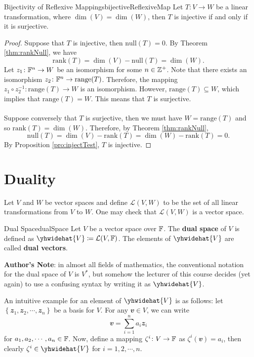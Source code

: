 \documentclass[math, code]{amznotes}
\theoremstyle{remark}
\begin{document}
\begin{corbox}{Bijectivity of Reflexive Mappings}{bijectiveReflexiveMap}
    Let $T \colon V \to W$ be a linear transformation, where $\dim(V) = \dim(W)$, then $T$ is injective if and only if it is surjective.
    \tcblower
    \begin{proof}
        Suppose that $T$ is injective, then $\mathrm{null}(T) = 0$. By Theorem \ref{thm:rankNull}, we have 
        \begin{equation*}
            \mathrm{rank}(T) = \dim(V) - \mathrm{null}(T) = \dim(W).
        \end{equation*} 
        Let $z_1 \colon \mathbb{F}^n \to W$ be an isomorphism for some $n \in \mathbb{Z}^+$. Note that there exists an isomorphism $z_2 \colon \mathbb{F}^n \to \mathrm{range}(T)$. Therefore, the mapping $z_1 \circ z_2^{-1} \colon \mathrm{range}(T) \to W$ is an isomorphism. However, $\mathrm{range}(T) \subseteq W$, which implies that $\mathrm{range}(T) = W$. This means that $T$ is surjective.
        \\\\
        Suppose conversely that $T$ is surjective, then we must have $W = \mathrm{range}(T)$ and so $\mathrm{rank}(T) = \dim(W)$. Therefore, by Theorem \ref{thm:rankNull}, 
        \begin{equation*}
            \mathrm{null}(T) = \dim(V) - \mathrm{rank}(T) = \dim(W) - \mathrm{rank}(T) = 0.
        \end{equation*}
        By Proposition \ref{pro:injectTest}, $T$ is injective.
    \end{proof}
\end{corbox}
\section{Duality}
Let $V$ and $W$ be vector spaces and define $\mathcal{L}(V, W)$ to be the set of all linear transformations from $V$ to $W$. One may check that $\mathcal{L}(V, W)$ is a vector space.
\begin{dfnbox}{Dual Space}{dualSpace}
    Let $V$ be a vector space over $\mathbb{F}$. The {\color{red} \textbf{dual space}} of $V$ is defined as $\yhwidehat{V} \coloneqq \mathcal{L}(V, \F)$. The elements of $\yhwidehat{V}$ are called {\color{red} \textbf{dual vectors}}.
\end{dfnbox}
\begin{notebox}
    \textbf{Author's Note}: in almost all fields of mathematics, the conventional notation for the dual space of $V$ is $V^*$, but somehow the lecturer of this course decides (yet again) to use a confusing syntax by writing it as $\yhwidehat{V}$.
\end{notebox}
An intuitive example for an element of $\yhwidehat{V}$ is as follows: let $\left\{\mathbfit{z}_1, \mathbfit{z}_2, \cdots, \mathbfit{z}_n\right\}$ be a basis for $V$. For any $\mathbfit{v} \in V$, we can write
\begin{equation*}
    \mathbfit{v} = \sum_{i = 1}^{n}a_i\mathbfit{z}_i
\end{equation*}
for $a_1, a_2, \cdots, a_n \in \mathbb{F}$. Now, define a mapping $\zeta^i \colon V \to \mathbb{F}$ as $\zeta^i(\mathbfit{v}) = a_i$, then clearly $\zeta^i \in \yhwidehat{V}$ for $i = 1, 2, \cdots, n$.
\end{document}
